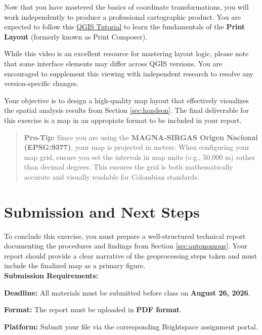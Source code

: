 \documentclass{article}
\begin{document}
Now that you have mastered the basics of coordinate transformations, you will work independently to produce a professional cartographic product. You are expected to follow this \href{http://www.youtube.com/watch?v=LFJGLaH4Tvg}{QGIS Tutorial} to learn the fundamentals of the \textbf{Print Layout} (formerly known as Print Composer).

While this video is an excellent resource for mastering layout logic, please note that some interface elements may differ across QGIS versions. You are encouraged to supplement this viewing with independent research to resolve any version-specific changes.

Your objective is to design a high-quality map layout that effectively visualizes the spatial analysis results from Section \ref{sec:handson}. The final deliverable for this exercise is a map in an appropiate format to be included in your report.

\begin{quote}
    \textbf{Pro-Tip:} Since you are using the \textbf{MAGNA-SIRGAS Origen Nacional (EPSG:9377)}, your map is projected in meters. When configuring your map grid, ensure you set the intervals in map units (e.g., 50,000 m) rather than decimal degrees. This ensures the grid is both mathematically accurate and visually readable for Colombian standards.
\end{quote}

\section{Submission and Next Steps} \label{sec:submission}

To conclude this exercise, you must prepare a well-structured technical report documenting the procedures and findings from Section \ref{sec:autonomous}. Your report should provide a clear narrative of the geoprocessing steps taken and must include the finalized map as a primary figure. \\

\textbf{Submission Requirements:}
\begin{itemize}
    \begin{small}
    \item \textbf{Deadline:} All materials must be submitted before class on \textbf{August 26, 2026}.
    \item \textbf{Format:} The report must be uploaded in \textbf{PDF format}.
    \item \textbf{Platform:} Submit your file via the corresponding {Brightspace\texttrademark} assignment portal.
    \end{small}
\end{itemize}
\end{document}
